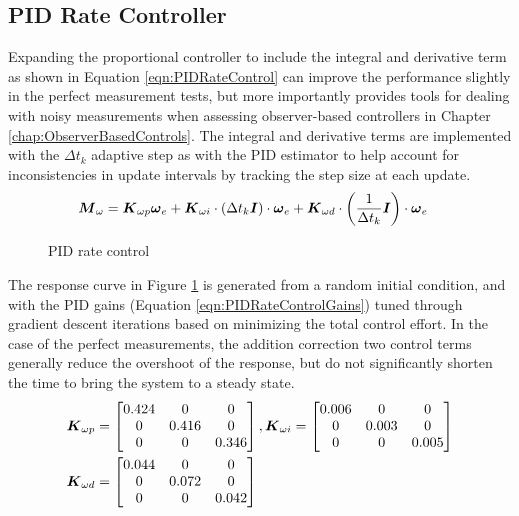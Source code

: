 \subsection{PID Rate Controller}
\label{subsec:PIDRateControl}

Expanding the proportional controller to include the integral and derivative term as shown in Equation \ref{eqn:PIDRateControl} can improve the performance slightly in the perfect measurement tests, but more importantly provides tools for dealing with noisy measurements when assessing observer-based controllers in Chapter \ref{chap:ObserverBasedControls}.  The integral and derivative terms are implemented with the $\Delta t_k$ adaptive step as with the PID estimator to help account for inconsistencies in update intervals by tracking the step size at each update.
\begin{equation}
  \begin{aligned}
    \boldsymbol{M}_{\omega} &= \boldsymbol{K}_{\omega p} \boldsymbol{\omega}_e + \boldsymbol{K}_{\omega i} \cdot (\Delta t_k \boldsymbol{I})\cdot \boldsymbol{\omega}_e + \boldsymbol{K}_{\omega d} \cdot \left(\frac{1}{\Delta t_k} \boldsymbol{I}\right) \cdot \boldsymbol{\omega}_e
  \end{aligned}
  \label{eqn:PIDRateControl}
\end{equation}
\begin{figure}[H]
  \centerline{}
  \caption{PID rate control}
  \label{fig:PIDRateControl}
\end{figure}
The response curve in Figure \ref{fig:PIDRateControl} is generated from a random initial condition, and with the PID gains (Equation \ref{eqn:PIDRateControlGains}) tuned through gradient descent iterations based on minimizing the total control effort.  In the case of the perfect measurements, the addition correction two control terms generally reduce the overshoot of the response, but do not significantly shorten the time to bring the system to a steady state.
\begin{equation}
  \begin{aligned}
    \boldsymbol{K}_{\omega p} &= \begin{bmatrix} 0.424 & 0 & 0 \\ 0 & 0.416 & 0 \\ 0 & 0 & 0.346 \end{bmatrix},
    \boldsymbol{K}_{\omega i} = \begin{bmatrix} 0.006 & 0 & 0 \\ 0 & 0.003 & 0 \\ 0 & 0 & 0.005 \end{bmatrix} \\
    \boldsymbol{K}_{\omega d} &= \begin{bmatrix} 0.044 & 0 & 0 \\ 0 & 0.072 & 0 \\ 0 & 0 & 0.042 \end{bmatrix}
  \end{aligned}
  \label{eqn:PIDRateControlGains}
\end{equation}
